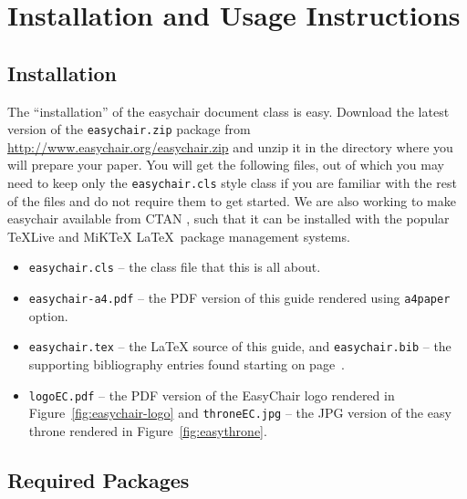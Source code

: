 \documentclass{easychair}
\newcommand{\easychair}{\textsf{easychair}}
\newcommand{\miktex}{MiK{\TeX}}
\begin{document}
\section{Installation and Usage Instructions}
\label{sect:installation-usage}

\subsection{Installation}

The ``installation'' of the {\easychair} document class is easy.
Download the latest version of the \texttt{easychair.zip} package 
from \url{http://www.easychair.org/easychair.zip}
and unzip it in the directory where you will prepare your paper.
You will get the following files, out of which you may need to keep only 
the \texttt{easychair.cls} style class if you are familiar with the rest 
of the files and do not require them to get started.
We are also working to make {\easychair} available from CTAN \cite{ctan},
such that it can be installed with the popular \TeX Live \cite{texlive} and
{\miktex} \cite{miktex} \LaTeX\ package management systems.

\begin{itemize}
\item
\texttt{easychair.cls} -- the class file that this is all about.

\item
\texttt{easychair-a4.pdf} -- the PDF version of this guide rendered using 
\texttt{a4paper} option.

\item
\texttt{easychair.tex} -- the {\LaTeX} source of this guide, 
and
\texttt{easychair.bib} -- the supporting bibliography entries found starting 
on page~\pageref{sect:bib}.

\item
\texttt{logoEC.pdf} -- the PDF version of the EasyChair logo rendered in
Figure~\ref{fig:easychair-logo} and
\texttt{throneEC.jpg} -- the JPG version of the easy throne rendered in 
Figure~\ref{fig:easythrone}.

\end{itemize}

\subsection{Required Packages}
\end{document}
